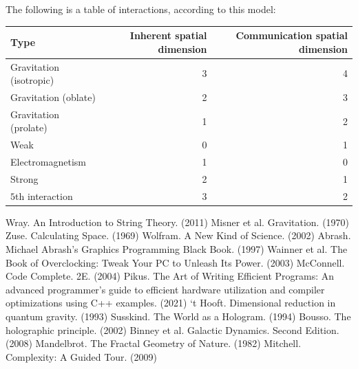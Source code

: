 \documentclass[12pt]{article}
\begin{document}
{The following is a table of interactions, according to this model:
\begin{center}
\begin{tabular}{| l | r | r |}
  \hline
  Type & Inherent spatial dimension & Communication spatial dimension \\
\hline
\hline
Gravitation (isotropic) & 3  & 4\\
Gravitation (oblate) & 2 & 3\\
Gravitation (prolate) & 1 & 2\\
Weak & 0 & 1\\
Electromagnetism & 1 & 0 \\
Strong & 2 & 1\\
$5$th interaction & 3 & 2 \\
  \hline  
\end{tabular}
\end{center}






\pagebreak




\begin{thebibliography}{9}

 Wray. An Introduction to String Theory. (2011)
 Misner et al. Gravitation. (1970)
 Zuse. Calculating Space. (1969)
 Wolfram. A New Kind of Science. (2002)
 Abrash. Michael Abrash's Graphics Programming Black Book. (1997)
 Wainner et al. The Book of Overclocking: Tweak Your PC to Unleash Its Power. (2003)
 McConnell. Code Complete. 2E. (2004)
 Pikus. The Art of Writing Efficient Programs: An advanced programmer's guide to efficient hardware utilization and compiler optimizations using C++ examples. (2021)
 `t Hooft. Dimensional reduction in quantum gravity. (1993)
 Susskind. The World as a Hologram. (1994)
 Bousso. The holographic principle. (2002)
 Binney et al. Galactic Dynamics. Second Edition. (2008)
 Mandelbrot. The Fractal Geometry of Nature. (1982)
 Mitchell. Complexity: A Guided Tour. (2009)






\end{thebibliography}}
\end{document}
